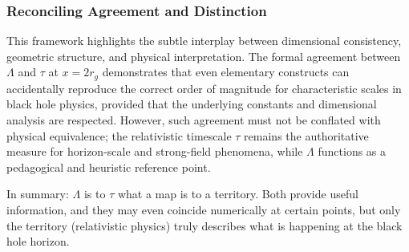 \documentclass[12pt,a4paper]{article}
\begin{document}
\subsubsection{Reconciling Agreement and Distinction}

This framework highlights the subtle interplay between dimensional consistency, geometric structure, and physical interpretation. The formal agreement between $\Lambda$ and $\tau$ at $x = 2r_g$ demonstrates that even elementary constructs can accidentally reproduce the correct order of magnitude for characteristic scales in black hole physics, provided that the underlying constants and dimensional analysis are respected. However, such agreement must not be conflated with physical equivalence; the relativistic timescale $\tau$ remains the authoritative measure for horizon-scale and strong-field phenomena, while $\Lambda$ functions as a pedagogical and heuristic reference point.

In summary: $\Lambda$ is to $\tau$ what a map is to a territory. Both provide useful information, and they may even coincide numerically at certain points, but only the territory (relativistic physics) truly describes what is happening at the black hole horizon.






\end{document}
